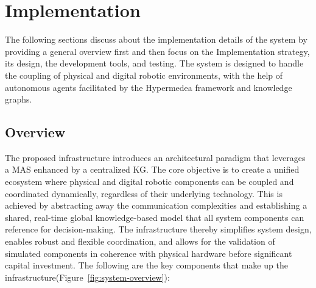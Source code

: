 \documentclass{article} %
\begin{document}
\section{Implementation}
The following sections discuss about the implementation details of the system by providing a general overview first and then focus on the Implementation strategy, its design, the development tools, and testing. The system is designed to handle the coupling of physical and digital robotic environments, with the help of autonomous agents facilitated by the Hypermedea framework and knowledge graphs.

\subsection{Overview}
The proposed infrastructure introduces an architectural paradigm that leverages a MAS enhanced by a centralized KG. The core objective is to create a unified ecosystem where physical and digital robotic components can be coupled and coordinated dynamically, regardless of their underlying technology. This is achieved by abstracting away the communication complexities and establishing a shared, real-time global knowledge-based model that all system components can reference for decision-making. The infrastructure thereby simplifies system design, enables robust and flexible coordination, and allows for the validation of simulated components in coherence with physical hardware before significant capital investment. The following are the key components that make up the infrastructure(Figure~\ref{fig:system-overview}):
\end{document}

